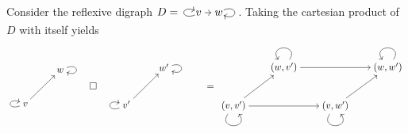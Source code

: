 \documentclass[12pt,dvipsnames,oneside]{amsart}
\theoremstyle{plain}
\theoremstyle{remark}
\theoremstyle{definition}
\begin{document}
\newcommand{\vwrefldig}{\begin{tikzcd}[cramped, column sep=tiny, ampersand replacement=\&]v \& w
    \arrow[from=1-1, to=1-1, loop, shift right, in=160, out=200, distance=5mm]
    \arrow[from=1-1, to=1-2]
    \arrow[from=1-2, to=1-2, loop, shift right, in=340, out=20 , distance=5mm]\end{tikzcd}}
\newcommand{\bulletrefldig}{\begin{tikzcd}[every cell/.append style={inner sep=3pt}, ampersand replacement=\&]
    \bullet
    \arrow[loop, shift right, in=160, out=200, distance=5mm]
  \end{tikzcd}}
\begin{example}\label{ex:rgraph-mon}
  Consider the reflexive digraph \(D=\!\!\vwrefldig\!\!\).
  Taking the cartesian product of \(D\) with itself yields
  \begin{equation}\label{eq:tp-of-interval-graphs}
    \begin{gathered}
      \begin{tikzcd}[ampersand replacement=\&,cramped,row sep=25pt,column sep=normal,every matrix/.append style={inner sep=0pt}]
\& {w} \arrow[loop, in=340, out=20, distance=5mm]\\
        {v} \arrow[ur]\arrow[loop, in=160, out=200, distance=5mm]\&
\end{tikzcd}
    \end{gathered} \quad \square \quad \begin{gathered}
      \begin{tikzcd}[ampersand replacement=\&,cramped,row sep=25pt,column sep=normal,every matrix/.append style={inner sep=0pt}]
\& {w'} \arrow[loop, in=340, out=20, distance=5mm]\\
        {v'} \arrow[ur]\arrow[loop, in=160, out=200, distance=5mm]\&
\end{tikzcd}
    \end{gathered}
    \qquad =
    \begin{gathered}
      \begin{tikzcd}[ampersand replacement=\&,cramped,row sep=24pt,column sep=20pt,every matrix/.append style={inner sep=0pt}]
\& {(w,v')} \arrow[loop, in=125, out=55, distance=7mm]\arrow[rr]\& \& {(w,w')} \arrow[loop, in=125, out=55, distance=7mm]\\
        {(v,v')} \arrow[ur]\arrow[loop, in=305, out=235, distance=7mm]\arrow[rr]\& \& {(v,w')} \arrow[ur]\arrow[loop, in=305, out=235, distance=7mm]\&
\end{tikzcd}
    \end{gathered}
  \end{equation}
  \smallskip



\end{example}
\end{document}
